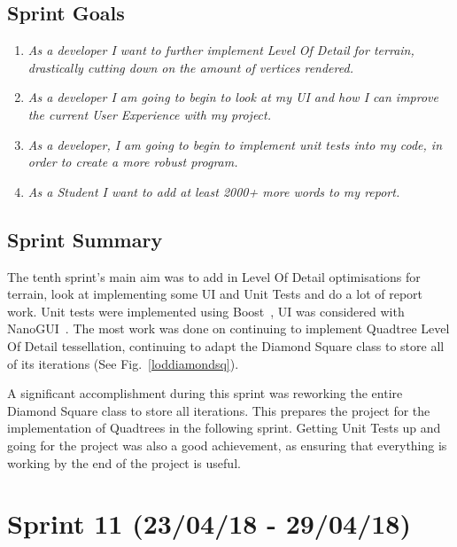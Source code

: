 \documentclass[a4paper,10pt]{report}
\begin{document}
\subsection{Sprint Goals}

\begin{enumerate}

    \item \textit{As a developer I want to further implement Level Of Detail for terrain, drastically cutting down on the amount of vertices rendered.}

    \item \textit{As a developer I am going to begin to look at my UI and how I can improve the current User Experience with my project.}

    \item \textit{As a developer, I am going to begin to implement unit tests into my code, in order to create a more robust program. }
    \item \textit{As a Student I want to add at least 2000+ more words to my report.}

\end{enumerate}

\subsection{Sprint Summary}

The tenth sprint's main aim was to add in Level Of Detail optimisations for terrain, look at implementing some UI and Unit Tests and do a lot of report work. Unit tests were implemented using Boost~\cite{boost}, UI was considered with NanoGUI~\cite{nanogui}. The most work was done on continuing to implement Quadtree Level Of Detail tessellation, continuing to adapt the Diamond Square class to store all of its iterations (See Fig.~\ref{loddiamondsq}). \medskip

A significant accomplishment during this sprint was reworking the entire Diamond Square class to store all iterations. This prepares the project for the implementation of Quadtrees in the following sprint. Getting Unit Tests up and going for the project was also a good achievement, as ensuring that everything is working by the end of the project is useful.


\clearpage
\section{Sprint 11 (23/04/18 -  29/04/18)}
\end{document}
